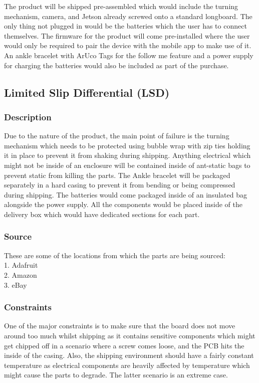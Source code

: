 The product will be shipped pre-assembled which would include the turning mechanism, camera, and Jetson already screwed onto a standard longboard. The only thing not plugged in would be the batteries which the user has to connect themselves. The firmware for the product will come pre-installed where the user would only be required to pair the device with the mobile app to make use of it. An ankle bracelet with ArUco Tags for the follow me feature and a power supply for charging the batteries would also be included as part of the purchase.

\subsection{Limited Slip Differential (LSD)}
\subsubsection{Description}
Due to the nature of the product, the main point of failure is the turning mechanism which needs to be protected using bubble wrap with zip ties holding it in place to prevent it from shaking during shipping. Anything electrical which might not be inside of an enclosure will be contained inside of ant-static bags to prevent static from killing the parts. The Ankle bracelet will be packaged separately in a hard casing to prevent it from bending or being compressed during shipping. The batteries would come packaged inside of an insulated bag alongside the power supply. All the components would be placed inside of the delivery box which would have dedicated sections for each part.
\subsubsection{Source}
These are some of the locations from which the parts are being sourced:\\
1. Adafruit\\
2. Amazon\\
3. eBay
\subsubsection{Constraints}
One of the major constraints is to make sure that the board does not move around too much whilst shipping as it contains sensitive components which might get chipped off in a scenario where a screw comes loose, and the PCB hits the inside of the casing. Also, the shipping environment should have a fairly constant temperature as electrical components are heavily affected by temperature which might cause the parts to degrade. The latter scenario is an extreme case.
